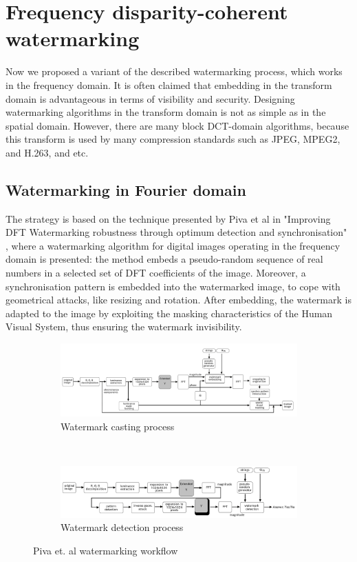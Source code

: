\chapter{Frequency disparity-coherent watermarking}
\label{dft}

Now we proposed a variant of the described watermarking process, which works in the frequency domain. It is often claimed that embedding in the transform domain is advantageous in terms of visibility and security. Designing watermarking algorithms in the transform domain is not as simple as in the spatial domain. However, there are many block DCT-domain algorithms, because this transform is used by many compression standards such as JPEG, MPEG2, and H.263, and etc.

\section{Watermarking in Fourier domain}

The strategy is based on the technique presented by Piva et al in "Improving DFT Watermarking robustness through optimum detection and synchronisation" \cite{PIVA}, where a watermarking algorithm for digital images operating in the frequency domain is presented: the method embeds a pseudo-random sequence of real numbers in a selected set of DFT coefficients of the image. Moreover, a synchronisation pattern is embedded into the watermarked image, to cope with geometrical attacks, like resizing and rotation. After embedding, the watermark is adapted to the image by exploiting the masking characteristics of the Human Visual System, thus ensuring the watermark invisibility.\newline
\begin{figure}[h!]
\centering
\begin{subfigure}[]{\textwidth}
\centering
\includegraphics[width=1\textwidth]{./img/casting.png}
\caption{\scriptsize{Watermark casting process}\label{fig:cast}}
\end{subfigure} 
~\quad
\begin{subfigure}[]{\textwidth}
\centering
\includegraphics[width=1\textwidth]{./img/detection.png}
\caption{\scriptsize{Watermark detection process}\label{fig:det}}
\end{subfigure}%
\caption{\small{Piva et. al watermarking workflow}\label{fig:blocchi}}
\end{figure}

